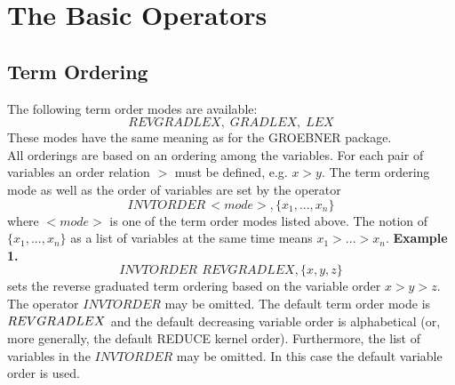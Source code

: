 \section{The Basic Operators}
\subsection{Term Ordering}
The following term order modes are available:
$$ REVGRADLEX,\; GRADLEX,\; LEX $$
These modes have the same meaning as for the GROEBNER package.\\
All orderings are based on an ordering among the variables.
For each pair of variables an order relation $>$ must be defined,
e.g. $x>y$. The term ordering mode as well as the order of variables
are set by the operator
$$ INVTORDER\,<mode>,\{x_1,...,x_n\} $$
where $<mode>$ is one of the term order modes listed above.
The notion of $\{x_1,...,x_n\}$ as a list of variables
at the same time means $x_1>...>x_n$.
\vskip 0.1cm
\noindent
{\bf Example 1.}
$$ INVTORDER\>\,REVGRADLEX,\{x,y,z\} $$
sets the reverse graduated term ordering based on the variable
order $x>y>z$.\\
The operator $INVTORDER$ may be omitted. The default term order mode
is $REV\-GRADLEX$ and the default decreasing variable order is
alphabetical (or, more generally, the default REDUCE kernel order).
Furthermore, the list of variables in the $INVTORDER$ may be omitted.
In this case the default variable order is used.
